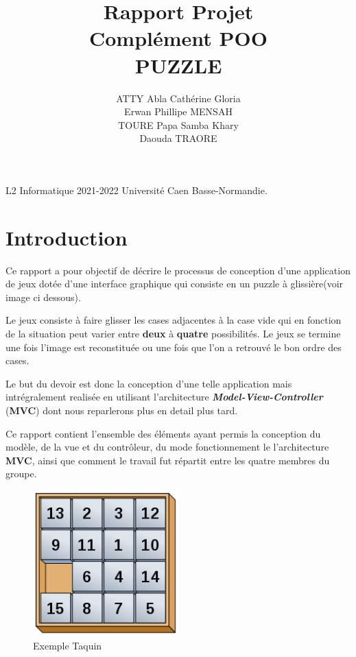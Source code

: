 \documentclass[12pt]{article}
\title{Rapport Projet \\Complément POO \\ \textbf{PUZZLE} }
\author{ ATTY Abla Cathérine Gloria\\ Erwan Phillipe MENSAH \\ TOURE Papa Samba Khary \\Daouda TRAORE}
\date{}
\begin{document}
\maketitle
\mbox{}
\vfill
L2 Informatique 2021-2022 Université Caen Basse-Normandie.

\newpage
\tableofcontents

\newpage
\section{Introduction}

Ce rapport a pour objectif de décrire le processus de conception d'une application de jeux
dotée d'une interface graphique qui consiste en un puzzle à glissière(voir image ci dessous).

Le jeux consiste à faire glisser les cases adjacentes à la case vide qui en fonction de la situation 
peut varier entre \textbf{deux} à \textbf{quatre} possibilités. Le jeux se termine une fois 
l'image est reconstituée ou une fois que l'on a retrouvé le bon ordre des cases.

Le but du devoir est donc la conception d'une telle application mais intrégralement realisée
en utilisant l'architecture \textbf{\textit{Model-View-Controller}} (\textbf{MVC}) dont nous 
reparlerons plus en detail plus tard.   

Ce rapport contient l'ensemble des éléments ayant permis la conception du modèle, de la 
vue et du contrôleur, du mode fonctionnement le l'architecture \textbf{MVC}, ainsi 
que comment le travail fut répartit entre les quatre membres du groupe.
\begin{figure}[h!]
	\begin{center}
		\includegraphics[width=0.5\textwidth]{taquin.png}
	\end{center}
	\caption{Exemple Taquin}
	\label{taquin}
\end{figure}
\end{document}
